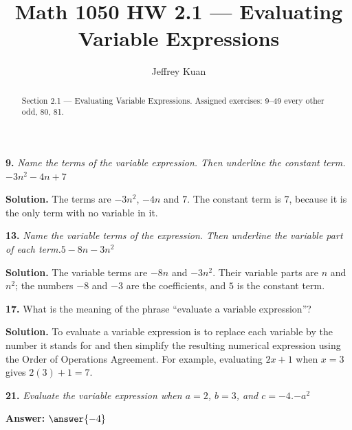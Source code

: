 \documentclass{ximera}
\author{Jeffrey Kuan}
\title{Math 1050 HW 2.1 --- Evaluating Variable Expressions}
\begin{document}
\begin{abstract}
    Section 2.1 --- Evaluating Variable Expressions.
    Assigned exercises: 9–49 every other odd, 80, 81.
\end{abstract}

\maketitle

\begin{problem}
\textbf{9.} \emph{Name the terms of the variable expression. Then underline the constant term.}\quad $-3n^2 - 4n + 7$

\begin{hint}
\textbf{Solution.} The terms are $-3n^{2}$, $-4n$ and $7$. The constant term is $7$, because it is the only term with no variable in it.
\end{hint}
\end{problem}

\begin{problem}
\textbf{13.} \emph{Name the variable terms of the expression. Then underline the variable part of each term.}\quad $5 - 8n - 3n^2$

\begin{hint}
\textbf{Solution.} The variable terms are $-8n$ and $-3n^{2}$. Their variable parts are $n$ and $n^{2}$; the numbers $-8$ and $-3$ are the coefficients, and $5$ is the constant term.
\end{hint}
\end{problem}

\begin{problem}
\textbf{17.} What is the meaning of the phrase ``evaluate a variable expression''?

\begin{hint}
\textbf{Solution.} To evaluate a variable expression is to replace each variable by the number it stands for and then simplify the resulting numerical expression using the Order of Operations Agreement. For example, evaluating $2x+1$ when $x=3$ gives $2(3)+1=7$.
\end{hint}
\end{problem}

\begin{problem}
\textbf{21.} \emph{Evaluate the variable expression when $a = 2$, $b = 3$, and $c = -4$.}\quad $-a^2$

\textbf{Answer:} $\answer{-4}$
\end{problem}
\end{document}
